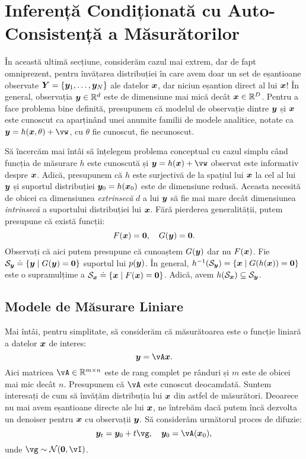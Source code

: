 \documentclass[../../book-main_ro.tex]{subfiles}
\begin{document}
\section{Inferență Condiționată cu Auto-Consistență a Măsurătorilor}
\label{sec:measurement-self-consistency}
În această ultimă secțiune, considerăm cazul mai extrem, dar de fapt omniprezent, pentru învățarea distribuției în care avem doar un set de eșantioane observate $\bm{Y} = \{\bm{y}_1,\ldots, \bm{y}_N\}$ ale datelor $\bm{x}$, dar niciun eșantion direct al lui $\bm{x}$! În general, observația $\bm{y} \in \mathbb{R}^d$ este de dimensiune mai mică decât $\bm{x} \in \mathbb{R}^D$. Pentru a face problema bine definită, presupunem că modelul de observație dintre $\bm{y}$ și $\bm{x}$ este cunoscut ca aparținând unei anumite familii de modele analitice, notate ca $\y = h(\x, \theta) +\vw$, cu $\theta$ fie cunoscut, fie necunoscut.

Să încercăm mai întâi să înțelegem problema conceptual cu cazul simplu când funcția de măsurare $h$ este cunoscută și $\y = h(\x) + \vw$ observat este informativ despre $\bm{x}$. Adică, presupunem că $h$ este surjectivă de la spațiul lui $\bm{x}$ la cel al lui $\bm{y}$ și suportul distribuției $\bm{y}_0 = h(\bm{x}_0)$ este de dimensiune redusă. Aceasta necesită de obicei ca dimensiunea \textit{extrinsecă} $d$ a lui $\bm{y}$ să fie mai mare decât dimensiunea \textit{intrinsecă} a suportului distribuției lui $\bm{x}$. Fără pierderea generalității, putem presupune că există funcții:
\begin{equation}
F(\bm{x}) = \boldsymbol{0},\quad     G(\bm{y}) = \boldsymbol{0}.
\end{equation}
Observați că aici putem presupune că cunoaștem $G(\bm{y})$ dar nu $F(\bm{x})$. Fie $\mathcal{S}_{\bm{y}} \doteq \{\bm{y} \mid G(\bm{y}) = \boldsymbol{0}\}$ suportul lui $p(\bm{y})$. În general, $h^{-1}(\mathcal{S}_{\bm{y}}) = \{\bm{x} \mid G(h(\bm{x})) = \boldsymbol{0}\}$ este o supramulțime a $\mathcal{S}_{\bm{x}} \doteq \{\bm{x} \mid F(\bm{x}) = \boldsymbol{0}\}$. Adică, avem $h(\mathcal{S}_{\bm{x}}) \subseteq \mathcal{S}_{\bm{y}}$.



\subsection{Modele de Măsurare Liniare}
Mai întâi, pentru simplitate, să considerăm că măsurătoarea este o funcție liniară a datelor $\bm{x}$ de interes:
\begin{equation}
    \y = \vA\x.
\end{equation}
Aici matricea $\vA \in \mathbb{R}^{m\times n}$ este de rang complet pe rânduri și $m$ este de obicei mai mic decât $n$. Presupunem că $\vA$ este cunoscut deocamdată. Suntem interesați de cum să învățăm distribuția lui $\bm{x}$ din astfel de măsurători. Deoarece nu mai avem eșantioane directe ale lui $\bm{x}$, ne întrebăm dacă putem încă dezvolta un denoiser pentru $\bm{x}$ cu observații $\bm{y}$. Să considerăm următorul proces de difuzie:
\begin{equation}
    \y_t = \y_0 + t \vg, \quad \y_0 = \vA(\x_0), 
\end{equation}
unde $\vg \sim \mathcal{N}(\boldsymbol{0}, \vI)$.
\end{document}
